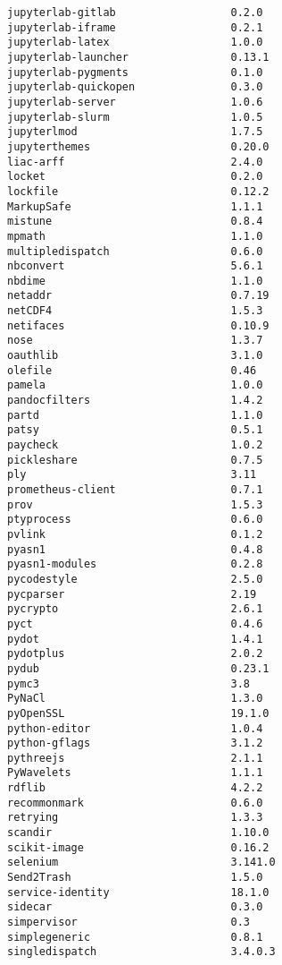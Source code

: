 \documentclass[11pt,a4paper]{article}
\begin{document}
\begin{verbatim}
jupyterlab-gitlab                  0.2.0
jupyterlab-iframe                  0.2.1
jupyterlab-latex                   1.0.0
jupyterlab-launcher                0.13.1
jupyterlab-pygments                0.1.0
jupyterlab-quickopen               0.3.0
jupyterlab-server                  1.0.6
jupyterlab-slurm                   1.0.5
jupyterlmod                        1.7.5
jupyterthemes                      0.20.0
liac-arff                          2.4.0
locket                             0.2.0
lockfile                           0.12.2
MarkupSafe                         1.1.1
mistune                            0.8.4
mpmath                             1.1.0
multipledispatch                   0.6.0
nbconvert                          5.6.1
nbdime                             1.1.0
netaddr                            0.7.19
netCDF4                            1.5.3
netifaces                          0.10.9
nose                               1.3.7
oauthlib                           3.1.0
olefile                            0.46
pamela                             1.0.0
pandocfilters                      1.4.2
partd                              1.1.0
patsy                              0.5.1
paycheck                           1.0.2
pickleshare                        0.7.5
ply                                3.11
prometheus-client                  0.7.1
prov                               1.5.3
ptyprocess                         0.6.0
pvlink                             0.1.2
pyasn1                             0.4.8
pyasn1-modules                     0.2.8
pycodestyle                        2.5.0
pycparser                          2.19
pycrypto                           2.6.1
pyct                               0.4.6
pydot                              1.4.1
pydotplus                          2.0.2
pydub                              0.23.1
pymc3                              3.8
PyNaCl                             1.3.0
pyOpenSSL                          19.1.0
python-editor                      1.0.4
python-gflags                      3.1.2
pythreejs                          2.1.1
PyWavelets                         1.1.1
rdflib                             4.2.2
recommonmark                       0.6.0
retrying                           1.3.3
scandir                            1.10.0
scikit-image                       0.16.2
selenium                           3.141.0
Send2Trash                         1.5.0
service-identity                   18.1.0
sidecar                            0.3.0
simpervisor                        0.3
simplegeneric                      0.8.1
singledispatch                     3.4.0.3

\end{verbatim}
\end{document}
